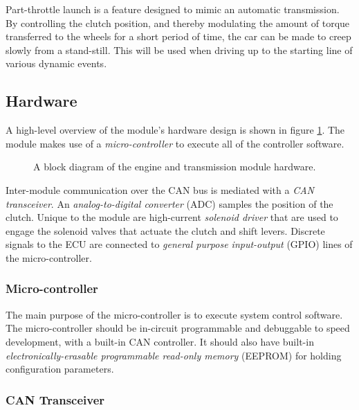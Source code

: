Part-throttle launch is a feature designed to mimic an automatic transmission. By controlling the clutch position, and thereby modulating the amount of torque transferred to the wheels for a short period of time, the car can be made to creep slowly from a stand-still. This will be used when driving up to the starting line of various dynamic events.

\subsection{Hardware}

A high-level overview of the module's hardware design is shown in figure \ref{fig:engine_hardware_design_block}. The module makes use of a \emph{micro-controller} to execute all of the controller software. 

\vspace{1em}
\begin{figure}[H]
	\centering
	
	\caption{A block diagram of the engine and transmission module hardware.}
	\label{fig:engine_hardware_design_block}
\end{figure}


Inter-module communication over the CAN bus is mediated with a \emph{CAN transceiver}. An \emph{analog-to-digital converter} (ADC) samples the position of the clutch. Unique to the module are high-current \emph{solenoid driver} that are used to engage the solenoid valves that actuate the clutch and shift levers. Discrete signals to the ECU are connected to \emph{general purpose input-output} (GPIO) lines of the micro-controller.

\subsubsection{Micro-controller}


The main purpose of the micro-controller is to execute system control software. The micro-controller should be in-circuit programmable and debuggable to speed development, with a built-in CAN controller. It should also have built-in \emph{electronically-erasable programmable read-only memory} (EEPROM) for holding configuration parameters.

\subsubsection{CAN Transceiver}

